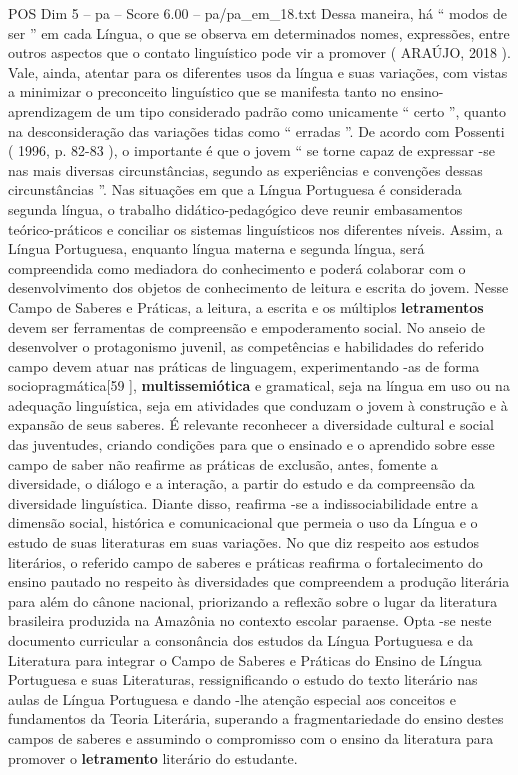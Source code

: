 \begin{textsample}{POS Dim 5 – pa – Score 6.00 – pa/pa\_em\_18.txt}
Dessa maneira, há “ modos de ser ” em cada Língua, o que se observa em determinados nomes, expressões, entre outros aspectos que o contato linguístico pode vir a promover ( ARAÚJO, 2018 ).
Vale, ainda, atentar para os diferentes usos da língua e suas variações, com vistas a minimizar o preconceito linguístico que se manifesta tanto no ensino-aprendizagem de um tipo considerado padrão como unicamente “ certo ”, quanto na desconsideração das variações tidas como “ erradas ”.
De acordo com Possenti ( 1996, p. 82-83 ), o importante é que o jovem “ se torne capaz de expressar -se nas mais diversas circunstâncias, segundo as experiências e convenções dessas circunstâncias ”.
Nas situações em que a Língua Portuguesa é considerada segunda língua, o trabalho didático-pedagógico deve reunir embasamentos teórico-práticos e conciliar os sistemas linguísticos nos diferentes níveis.
Assim, a Língua Portuguesa, enquanto língua materna e segunda língua, será compreendida como mediadora do conhecimento e poderá colaborar com o desenvolvimento dos objetos de conhecimento de leitura e escrita do jovem.
Nesse Campo de Saberes e Práticas, a leitura, a escrita e os múltiplos \textbf{letramentos} devem ser ferramentas de compreensão e empoderamento social.
No anseio de desenvolver o protagonismo juvenil, as competências e habilidades do referido campo devem atuar nas práticas de linguagem, experimentando -as de forma sociopragmática[59 ], \textbf{multissemiótica} e gramatical, seja na língua em uso ou na adequação linguística, seja em atividades que conduzam o jovem à construção e à expansão de seus saberes.
É relevante reconhecer a diversidade cultural e social das juventudes, criando condições para que o ensinado e o aprendido sobre esse campo de saber não reafirme as práticas de exclusão, antes, fomente a diversidade, o diálogo e a interação, a partir do estudo e da compreensão da diversidade linguística.
Diante disso, reafirma -se a indissociabilidade entre a dimensão social, histórica e comunicacional que permeia o uso da Língua e o estudo de suas literaturas em suas variações.
No que diz respeito aos estudos literários, o referido campo de saberes e práticas reafirma o fortalecimento do ensino pautado no respeito às diversidades que compreendem a produção literária para além do cânone nacional, priorizando a reflexão sobre o lugar da literatura brasileira produzida na Amazônia no contexto escolar paraense.
Opta -se neste documento curricular a consonância dos estudos da Língua Portuguesa e da Literatura para integrar o Campo de Saberes e Práticas do Ensino de Língua Portuguesa e suas Literaturas, ressignificando o estudo do texto literário nas aulas de Língua Portuguesa e dando -lhe atenção especial aos conceitos e fundamentos da Teoria Literária, superando a fragmentariedade do ensino destes campos de saberes e assumindo o compromisso com o ensino da literatura para promover o \textbf{letramento} literário do estudante.

\end{textsample}
